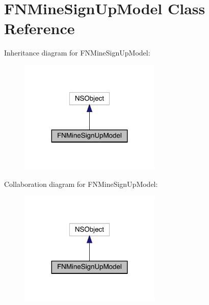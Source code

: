 \hypertarget{interface_f_n_mine_sign_up_model}{}\section{F\+N\+Mine\+Sign\+Up\+Model Class Reference}
\label{interface_f_n_mine_sign_up_model}


Inheritance diagram for F\+N\+Mine\+Sign\+Up\+Model\+:\nopagebreak
\begin{figure}[H]
\begin{center}
\leavevmode
\includegraphics[width=191pt]{interface_f_n_mine_sign_up_model__inherit__graph}
\end{center}
\end{figure}


Collaboration diagram for F\+N\+Mine\+Sign\+Up\+Model\+:\nopagebreak
\begin{figure}[H]
\begin{center}
\leavevmode
\includegraphics[width=191pt]{interface_f_n_mine_sign_up_model__coll__graph}
\end{center}
\end{figure}

